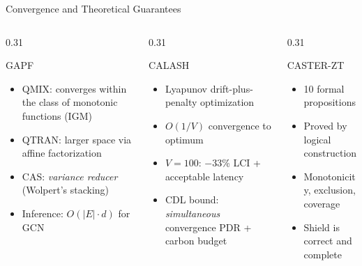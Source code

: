 \documentclass[10pt,aspectratio=169]{beamer}
\begin{document}
\begin{frame}[shrink=8]{Convergence and Theoretical Guarantees}
\begin{columns}[T]
\begin{column}{0.31\textwidth}
  \begin{block}{GAPF}
    \begin{itemize}\small
      \item QMIX: converges within the class of monotonic functions (IGM)
      \item QTRAN: larger space via affine factorization
      \item CAS: \emph{variance reducer} (Wolpert's stacking)
      \item Inference: $O(|E| \cdot d)$ for GCN
    \end{itemize}
  \end{block}
\end{column}
\begin{column}{0.31\textwidth}
  \begin{block}{CALASH}
    \begin{itemize}\small
      \item Lyapunov drift-plus-penalty optimization
      \item $O(1/V)$ convergence to optimum
      \item $V=100$: $-$33\% LCI + acceptable latency
      \item CDL bound: \emph{simultaneous} convergence PDR + carbon budget
    \end{itemize}
  \end{block}
\end{column}
\begin{column}{0.31\textwidth}
  \begin{block}{CASTER-ZT}
    \begin{itemize}\small
      \item 10 formal propositions
      \item Proved by logical construction
      \item Monotonicity, exclusion, coverage
      \item Shield is correct and complete
    \end{itemize}
  \end{block}
\end{column}
\end{columns}
\end{frame}
\end{document}
